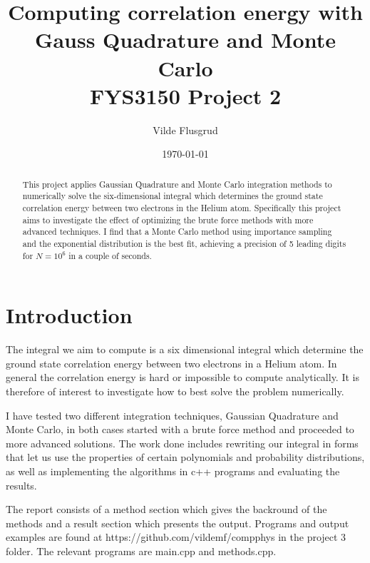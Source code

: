 \documentclass[norsk,a4paper,11pt]{article}
\title{Computing correlation energy with Gauss Quadrature and Monte Carlo \\ FYS3150 Project 2}
\author{Vilde Flusgrud}
\begin{document}
\date{\today}
\maketitle

\begin{abstract}
    This project applies Gaussian Quadrature and Monte Carlo integration methods to numerically solve the six-dimensional integral
    which determines the ground state correlation energy between two electrons in the Helium atom. Specifically this project aims to
    investigate the effect of optimizing the brute force methods with more advanced techniques. I find that a Monte Carlo method
    using importance sampling and the exponential distribution is the best fit, achieving a precision of 5 leading digits for $N=10^6$
    in a couple of seconds.
\end{abstract}
    

\section{Introduction}
The integral we aim to compute is a six dimensional integral which determine the ground state correlation energy
between two electrons in a Helium atom. In general the correlation energy is hard or impossible to compute analytically.
It is therefore of interest to investigate how to best solve the problem numerically.

I have tested two different integration techniques, Gaussian Quadrature and Monte Carlo, in both cases started with a brute force
method and proceeded to more advanced solutions. The work done includes rewriting our integral
in forms that let us use the properties of certain polynomials and probability distributions, as well as implementing the algorithms
in c++ programs and evaluating the results.

The report consists of a method section which gives the backround of the methods and a result section which presents the output. Programs
and output examples are found at https://github.com/vildemf/compphys in the project 3 folder. The relevant programs are main.cpp and
methods.cpp.
\end{document}
